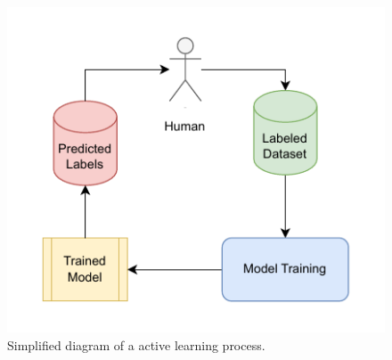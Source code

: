 \begin{figure}[htbp]
\centering
\includegraphics[width=.6\linewidth]{images/active_learning.drawio.pdf}
\caption{Simplified diagram of a active learning process.}
\label{fig:activelearning}
\end{figure}